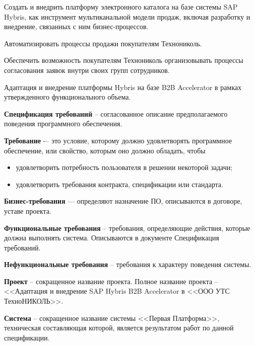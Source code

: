




	
	Создать и внедрить платформу электронного каталога на базе системы SAP Hybris, как инструмент мультиканальной модели продаж, включая разработку и внедрение, связанных с ним бизнес-процессов.
	
	
	Автоматизировать процессы продажи покупателям Технониколь.  
	
	Обеспечить возможность покупателям Технониколь организовывать процессы согласования заявок внутри своих групп сотрудников. 
	

	Адаптация и внедрение платформы Hybris на базе B2B Accelerator в рамках утвержденного функционального объема. 


\textbf{Спецификация требований} -- согласованное описание предполагаемого поведения программного обеспечения.

\textbf{Требование} -– это условие, которому должно удовлетворять программное обеспечение, или свойство, которым оно должно обладать, чтобы 
\begin{itemize}
\item удовлетворить потребность пользователя в решении некоторой задачи; 
\item удовлетворить требования контракта, спецификации или стандарта. 
\end{itemize}

\textbf{Бизнес-требования} — определяют назначение ПО, описываются в договоре, уставе проекта.

\textbf{Функциональные требования} -- требования, определяющие действия, которые должна выполнять система. Описываются в документе Спецификация требований.

\textbf{Нефункциональные требования} -- требования к характеру поведения системы.

\textbf{Проект} -- сокращенное название проекта. Полное название проекта -- <<Адаптация и внедрение SAP Hybris B2B Accelerator в <<ООО УТС ТехноНИКОЛЬ>>. 

\textbf{Система} -- сокращенное название системы <<Первая Платформа>>, техническая составляющая которой, является результатом работ по данной спецификации.

